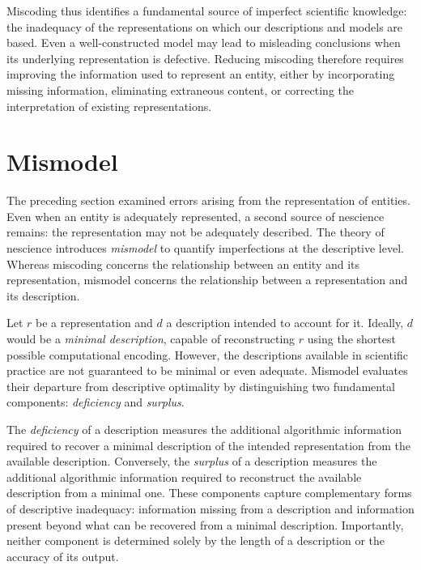Miscoding thus identifies a fundamental source of imperfect scientific knowledge: the inadequacy of the representations on which our descriptions and models are based. Even a well-constructed model may lead to misleading conclusions when its underlying representation is defective. Reducing miscoding therefore requires improving the information used to represent an entity, either by incorporating missing information, eliminating extraneous content, or correcting the interpretation of existing representations.

%
%

\section{Mismodel}
\label{sec:ch1_mismodel}

The preceding section examined errors arising from the representation of entities. Even when an entity is adequately represented, a second source of nescience remains: the representation may not be adequately described. The theory of nescience introduces \emph{mismodel} to quantify imperfections at the descriptive level. Whereas miscoding concerns the relationship between an entity and its representation, mismodel concerns the relationship between a representation and its description.

Let $r$ be a representation and $d$ a description intended to account for it. Ideally, $d$ would be a \emph{minimal description}, capable of reconstructing $r$ using the shortest possible computational encoding. However, the descriptions available in scientific practice are not guaranteed to be minimal or even adequate. Mismodel evaluates their departure from descriptive optimality by distinguishing two fundamental components: \emph{deficiency} and \emph{surplus}.

The \emph{deficiency} of a description measures the additional algorithmic information required to recover a minimal description of the intended representation from the available description. Conversely, the \emph{surplus} of a description measures the additional algorithmic information required to reconstruct the available description from a minimal one. These components capture complementary forms of descriptive inadequacy: information missing from a description and information present beyond what can be recovered from a minimal description. Importantly, neither component is determined solely by the length of a description or the accuracy of its output.

